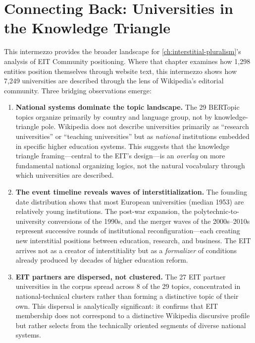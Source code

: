 \documentclass[../main.tex]{subfiles}
\begin{document}
\section*{Connecting Back: Universities in the Knowledge Triangle}

This intermezzo provides the broader landscape for
\cref{ch:interstitial-pluralism}'s analysis of EIT Community positioning.
Where that chapter examines how 1,298 entities position themselves through
website text, this intermezzo shows how 7,249 universities are described
through the lens of Wikipedia's editorial community. Three bridging
observations emerge:

\begin{enumerate}
    \item \textbf{National systems dominate the topic landscape.}
    The 29 BERTopic topics organize primarily by country and language group,
    not by knowledge-triangle pole. Wikipedia does not describe universities
    primarily as ``research universities'' or ``teaching universities'' but as
    \emph{national} institutions embedded in specific higher education
    systems. This suggests that the knowledge triangle framing---central to
    the EIT's design---is an \emph{overlay} on more fundamental national
    organizing logics, not the natural vocabulary through which universities
    are described.

    \item \textbf{The event timeline reveals waves of interstitialization.}
    The founding date distribution shows that most European universities
    (median 1953) are relatively young institutions. The post-war expansion,
    the polytechnic-to-university conversions of the 1990s, and the merger
    waves of the 2000s--2010s represent successive rounds of institutional
    reconfiguration---each creating new interstitial positions between
    education, research, and business. The EIT arrives not as a creator of
    interstitiality but as a \emph{formalizer} of conditions already
    produced by decades of higher education reform.

    \item \textbf{EIT partners are dispersed, not clustered.}
    The 27 EIT partner universities in the corpus spread across 8 of the 29
    topics, concentrated in national-technical clusters rather than forming
    a distinctive topic of their own. This dispersal is analytically
    significant: it confirms that EIT membership does not correspond to a
    distinctive Wikipedia discursive profile but rather selects from the
    technically oriented segments of diverse national systems.
\end{enumerate}

\closeintermezzo
\end{document}
